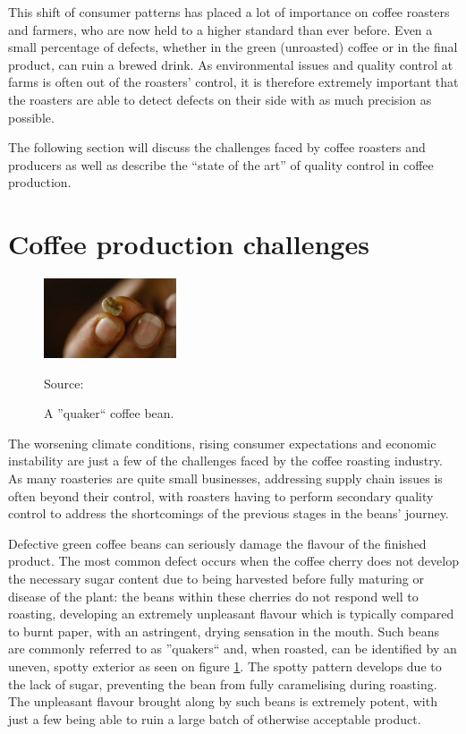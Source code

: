 This shift of consumer patterns has placed a lot of importance on coffee
roasters and farmers, who are now held to a higher standard than ever before.
Even a small percentage of defects, whether in the green (unroasted) coffee or in
the final product, can ruin a brewed drink. As environmental issues and quality control
at farms is often out of the roasters' control, it is therefore extremely important
that the roasters are able to detect defects on their side with as much precision
as possible.

The following section will discuss the challenges faced by coffee roasters and producers
as well as describe the ``state of the art'' of quality control in coffee production.

\section{Coffee production challenges}
\label{sec:coffee-production-challenges}
\begin{figure}
	\includegraphics[width=0.35\textwidth]{figures/introduction/quaker-coffee-bean}
	\caption*
	{Source: \cite{quakerBeanImg}}
	\caption{A ''quaker`` coffee bean.}
	\label{fig:quakerBeanExample}
	\vspace{-2em}
\end{figure}
The worsening climate conditions,
rising consumer expectations and economic instability are just a few of the
challenges faced by the coffee roasting industry. As many roasteries are quite small
businesses, addressing supply chain issues is often beyond their control, with roasters
having to perform secondary quality control to address the shortcomings of the previous
stages in the beans' journey.

Defective green coffee beans can seriously damage the flavour of the finished
product. The most common defect occurs when the coffee cherry does not develop the
necessary sugar content due to being harvested before fully maturing or disease of
the plant: the beans within these cherries do not respond well to roasting, developing
an extremely unpleasant flavour which is typically compared to burnt paper, with
an astringent, drying sensation in the mouth. Such beans are commonly referred
to as ''quakers`` and, when roasted, can be identified by an uneven, spotty exterior
as seen on figure \ref{fig:quakerBeanExample}. The spotty pattern develops due
to the lack of sugar, preventing the bean from fully caramelising during roasting.
The unpleasant flavour brought along by such beans is extremely potent, with just
a few being able to ruin a large batch of otherwise acceptable product.

